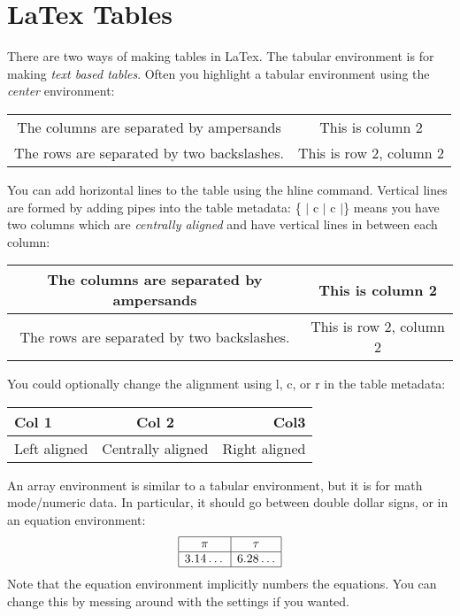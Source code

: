 \documentclass[11pt]{article}
\begin{document}
\section{LaTex Tables}
There are two ways of making tables in LaTex. The tabular environment is for making \emph{text based tables}. Often you highlight a tabular environment using the \emph{center} environment:
\begin{center}
    \begin{tabular}{c|c}
    The columns are separated by ampersands & This is column 2 \\
    The rows are separated by two backslashes.  & This is row 2, column 2
\end{tabular}
\end{center}
You can add horizontal lines to the table using the hline command. Vertical lines are formed by adding pipes into the table metadata: \{ $\vert$ c $\vert$ c $\vert$\} means you have two columns which are \emph{centrally aligned} and have vertical lines in between each column: 
\begin{center}
    \begin{tabular}{|c|c|}
    \hline
    The columns are separated by ampersands & This is column 2 \\
    \hline
    The rows are separated by two backslashes.  & This is row 2, column 2\\
    \hline
\end{tabular}
\end{center}
You could optionally change the alignment using l, c, or r in the table metadata:
\begin{center}
    \begin{tabular}{|l|c|r|}
    \hline
    Col 1& Col 2& Col3\\
    \hline
    Left aligned & Centrally aligned & Right aligned \\
    \hline
    
\end{tabular}
\end{center}

An array environment is similar to a tabular environment, but it is for math mode/numeric data. In particular, it should go between double dollar signs, or in an equation environment:
\begin{equation}
    \begin{array}{|c|c|}
    \hline
        \pi & \tau \\
        \hline
         3.14\dots&6.28\dots \\
         \hline
    \end{array}
\end{equation}
Note that the equation environment implicitly numbers the equations. You can change this by messing around with the settings if you wanted. 
\end{document}
